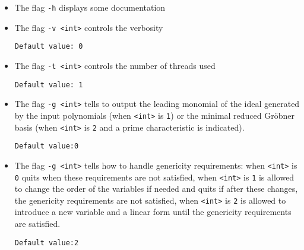 \documentclass[a4paper,english,11pt]{scrartcl}
\theoremstyle{definition}
\theoremstyle{remark}
\begin{document}
\begin{itemize}
\item The flag \verb+-h+ displays some documentation

\item The flag \verb+-v <int>+ controls the verbosity

  \hfill \verb+Default value: 0+

\item The flag \verb+-t <int>+ controls the number of threads used

  \hfill \verb+Default value: 1+

\item The flag \verb+-g <int>+ tells \msolve to output the leading monomial of
  the ideal generated by the input polynomials (when \verb+<int>+ is \verb+1+)
  or the minimal reduced Gr\"obner basis (when \verb+<int>+ is \verb+2+ and
  a prime characteristic is indicated).

  \hfill \verb+Default value:0+

\item The flag \verb+-g <int>+ tells \msolve how to handle genericity
  requirements: when \verb+<int>+ is \verb+0+ \msolve quits when these
  requirements are not satisfied, when \verb+<int>+ is \verb+1+ \msolve is
  allowed to change the order of the variables if needed and quits if after
  these changes, the genericity requirements are not satisfied,  when
  \verb+<int>+ is \verb+2+ \msolve is allowed to introduce a new variable and a
  linear form until the genericity requirements are satisfied. 

  \hfill \verb+Default value:2+

\end{itemize}
\end{document}
